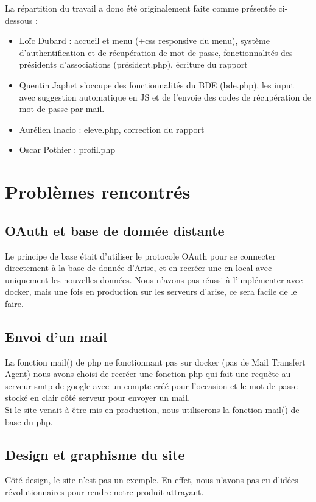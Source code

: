 \documentclass[french]{article}
\begin{document}
La répartition du travail a donc été originalement faite comme présentée ci-dessous : \\

\begin{itemize}
	\item Loïc Dubard : accueil et menu (+css responsive du menu), système d'authentification et de récupération de mot de passe, fonctionnalités des présidents d'associations (président.php), écriture du rapport\\ 
	\item Quentin Japhet s'occupe des fonctionnalités du BDE (bde.php), les input avec suggestion automatique en JS et de l'envoie des codes de récupération de mot de passe par mail. \\
	\item Aurélien Inacio : eleve.php, correction du rapport\\
	\item Oscar Pothier : profil.php\\
\end{itemize}

\section{Problèmes rencontrés}
\subsection{OAuth et base de donnée distante}
Le principe de base était d'utiliser le protocole OAuth pour se connecter directement à la base de donnée d'Arise, et en recréer une en local avec uniquement les nouvelles données. Nous n'avons pas réussi à l'implémenter avec docker, mais une fois en production sur les serveurs d'arise, ce sera facile de le faire.  

\subsection{Envoi d'un mail}
La fonction mail() de php ne fonctionnant pas sur docker (pas de Mail Transfert Agent) nous avons choisi de recréer une fonction php qui fait une requête au serveur smtp de google avec un compte créé pour l'occasion et le mot de passe stocké en clair côté serveur pour envoyer un mail.\\

Si le site venait à être mis en production, nous utiliserons la fonction mail() de base du php.\\

\subsection{Design et graphisme du site}
Côté design, le site n'est pas un exemple. En effet, nous n'avons pas eu d'idées révolutionnaires pour rendre notre produit attrayant.
\end{document}
